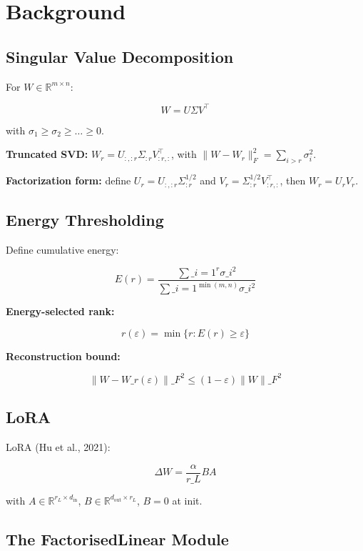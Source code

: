 \section{Background}

\subsection{Singular Value Decomposition}

For $W \in \mathbb{R}^{m \times n}$:

\[
W = U \Sigma V^\top
\tag{3.1}
\]

with $\sigma_1 \geq \sigma_2 \geq \dots \geq 0$.

\textbf{Truncated SVD:} $W_r = U_{:, :r} \Sigma_{:r} V_{:r, :}^\top$, with 
$\|W - W_r\|_F^2 = \sum_{i > r} \sigma_i^2$.

\textbf{Factorization form:} define $U_r = U_{:, :r} \Sigma_{:r}^{1/2}$ and 
$V_r = \Sigma_{:r}^{1/2} V_{:r, :}^\top$, then $W_r = U_r V_r$.

\subsection{Energy Thresholding}

Define cumulative energy:

\[
E(r) = \frac{\sum\_{i=1}^r \sigma\_i^2}{\sum\_{i=1}^{\min(m,n)} \sigma\_i^2}
\tag{3.2}
\]

\textbf{Energy-selected rank:}

\[
r(\varepsilon) = \min\{r : E(r) \geq \varepsilon\}
\tag{3.3}
\]

\textbf{Reconstruction bound:}

\[
\|W - W\_{r(\varepsilon)}\|\_F^2 \leq (1 - \varepsilon) \|W\|\_F^2
\tag{3.4}
\]

\subsection{LoRA}

LoRA (Hu et al., 2021):

\[
\Delta W = \frac{\alpha}{r\_L} B A
\tag{3.5}
\]

with $A \in \mathbb{R}^{r_L \times d_\text{in}}$, $B \in \mathbb{R}^{d_\text{out} \times r_L}$, $B = 0$ at init.

\subsection{The FactorisedLinear Module}

